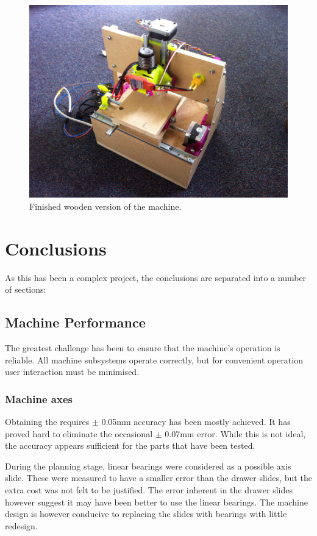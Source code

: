 \begin{figure}[ht!]
\centering
\includegraphics[width=160mm]{resources/finished.jpg}
\caption{Finished wooden version of the machine.}
\label{fig:finished}
\end{figure}

\section{Conclusions}
As this has been a complex project, the conclusions are separated into a number of sections:

\subsection{Machine Performance}
The greatest challenge has been to ensure that the machine's operation is reliable.
All machine subsystems operate correctly, but for convenient operation
user interaction must be minimised. 

\subsubsection{Machine axes}
Obtaining the requires $\pm$ 0.05mm accuracy has been mostly achieved. It has
proved hard to eliminate the occasional $\pm$ 0.07mm error. While this is not
ideal, the accuracy appears sufficient for the parts that have been tested.

During the planning stage, linear bearings were considered as a possible
axis slide. These were measured to have a smaller error than the drawer
slides, but the extra cost was not felt to be justified. The error inherent
in the drawer slides however suggest it may have been better to use the 
linear bearings. The machine design is however conducive to replacing
the slides with bearings with little redesign.

